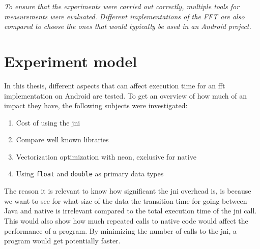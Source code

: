\textit{To ensure that the experiments were carried out correctly, multiple tools for measurements were evaluated. Different implementations of the FFT are also compared to choose the ones that would typically be used in an Android project.}

\section{Experiment model}


In this thesis, different aspects that can affect execution time for an \gls{fft} implementation on Android are tested. To get an overview of how much of an impact they have, the following subjects were investigated:

\begin{enumerate}
    \item Cost of using the \gls{jni}
    \item Compare well known libraries
    \item Vectorization optimization with \gls{neon}, exclusive for native
    \item Using \texttt{float} and \texttt{double} as primary data types
\end{enumerate}

The reason it is relevant to know how significant the \gls{jni} overhead is, is because we want to see for what size of the data the transition time for going between Java and native is irrelevant compared to the total execution time of the \gls{jni} call. This would also show how much repeated calls to native code would affect the performance of a program. By minimizing the number of calls to the \gls{jni}, a program would get potentially faster.


